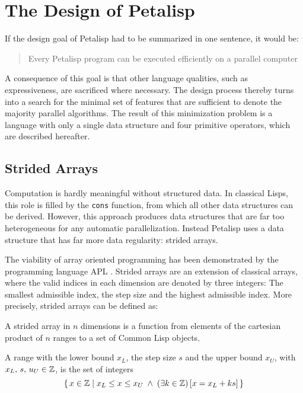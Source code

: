 \section{The Design of Petalisp}
\label{sec:design}

If the design goal of Petalisp had to be summarized in one sentence, it
would be:

\begin{quotation}
  Every Petalisp program can be executed efficiently on a parallel
  computer
\end{quotation}

\noindent A consequence of this goal is that other language qualities, such
as expressiveness, are sacrificed where necessary. The design process
thereby turns into a search for the minimal set of features that are
sufficient to denote the majority parallel algorithms. The result of this
minimization problem is a language with only a single data structure and
four primitive operators, which are described hereafter.

\subsection{Strided Arrays}
\label{sec:strided-arrays}

Computation is hardly meaningful without structured data. In classical
Lisps, this role is filled by the \texttt{cons} function, from which all
other data structures can be derived. However, this approach produces data
structures that are far too heterogeneous for any automatic
parallelization. Instead Petalisp uses a data structure that has far more
data regularity: strided arrays.

The viability of array oriented programming has been demonstrated by the
programming language APL \cite{APL}. Strided arrays are an extension of
classical arrays, where the valid indices in each dimension are denoted by
three integers: The smallest admissible index, the step size and the
highest admissible index. More precisely, strided arrays can be defined as:

\begin{define}
  A strided array in $n$ dimensions is a function from elements of the
  cartesian product of $n$ ranges to a set of Common Lisp objects.
\end{define}

\begin{define}[range]
  A range with the lower bound $x_L$, the step size $s$ and the upper bound
  $x_U$, with $x_L,\, s,\, u_U \in \mathbb{Z}$, is the set of integers
  $$\{\, x \in \mathbb{Z} \;|\; x_{L} \le x \le x_{U} \;\wedge\; (\exists k \in \mathbb{Z})\,[ x = x_{L} + k s]\,\}$$
\end{define}

